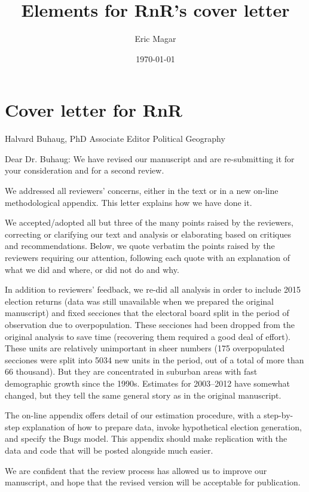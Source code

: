 \documentclass{article}
\author{Eric Magar}
\date{\today}
\title{Elements for RnR's cover letter}
\begin{document}
\maketitle
\tableofcontents


\section{Cover letter for RnR}
\label{sec:orgheadline1}
Halvard Buhaug, PhD
Associate Editor
Political Geography

Dear Dr. Buhaug: We have revised our manuscript and are re-submitting it for your consideration and for a second review. 

We addressed all reviewers' concerns, either in the text or in a new on-line methodological appendix. This letter explains how we have done it. 

We accepted/adopted all but three of the many points raised by the reviewers, correcting or clarifying our text and analysis or elaborating based on critiques and recommendations. Below, we quote verbatim the points raised by the reviewers requiring our attention, following each quote with an explanation of what we did and where, or did not do and why. 

In addition to reviewers' feedback, we re-did all analysis in order to include 2015 election returns (data was still unavailable when we prepared the original manuscript) and fixed secciones that the electoral board split in the period of observation due to overpopulation. These secciones had been dropped from the original analysis to save time (recovering them required a good deal of effort). These units are relatively unimportant in sheer numbers (175 overpopulated secciones were split into 5034 new units in the period, out of a total of more than 66 thousand). But they are concentrated in suburban areas with fast demographic growth since the 1990s. Estimates for 2003--2012 have somewhat changed, but they tell the same general story as in the original manuscript.

The on-line appendix offers detail of our estimation procedure, with a step-by-step explanation of how to prepare data, invoke hypothetical election generation, and specify the Bugs model. This appendix should make replication with the data and code that will be posted alongside much easier.

We are confident that the review process has allowed us to improve our manuscript, and hope that the revised version will be acceptable for publication.
\end{document}
